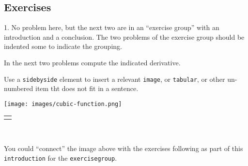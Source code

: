 \documentclass[10pt,]{article}
\theoremstyle{plain}
\theoremstyle{definition}
\theoremstyle{definition}
\theoremstyle{definition}
\theoremstyle{definition}
\theoremstyle{definition}
\theoremstyle{definition}
\numberwithin{equation}{section}
\newlength{\panelmax}
\begin{document}
\subsection[{Exercises}]{Exercises}\label{exercises-2}
\begin{exerciselist}
\item[1.]\hypertarget{exercises-null-problem}{}\hypertarget{p-280}{}%
No problem here, but the next two are in an ``exercise group'' with an introduction and a conclusion.  The two problems of the exercise group should be indented some to indicate the grouping.%
\par\smallskip
\hypertarget{exercisegroup-two-problems}{}\par\noindent \hypertarget{p-281}{}%
In the next two problems compute the indicated derivative.%
\par
\hypertarget{p-282}{}%
Use a \lstinline?sidebyside? element to insert a relevant \lstinline?image?, or \lstinline?tabular?, or other un-numbered item tht does not fit in a sentence.%
{%
\setlength{\panelmax}{0pt}
\ifdefined\panelboxAimage\else\newsavebox{\panelboxAimage}\fi%
\begin{lrbox}{\panelboxAimage}
\texttt{[image: images/cubic-function.png]}
\end{lrbox}
\ifdefined\phAimage\else\newlength{\phAimage}\fi%
\setlength{\phAimage}{\ht\panelboxAimage+\dp\panelboxAimage}
\settototalheight{\phAimage}{\usebox{\panelboxAimage}}
\setlength{\panelmax}{\maxof{\panelmax}{\phAimage}}
\leavevmode%
\setlength{\tabcolsep}{0\linewidth}
\par\medskip\noindent
\hspace*{0.35\linewidth}%
\begin{tabular}{@{}*{1}{c}@{}}
\begin{minipage}[c][\panelmax][t]{0.3\linewidth}\usebox{\panelboxAimage}\end{minipage}\end{tabular}\\
}%
\par
\hypertarget{p-283}{}%
You could ``connect'' the image above with the exercises following as part of this \lstinline?introduction? for the \lstinline?exercisegroup?.%

\end{exerciselist}
\end{document}
